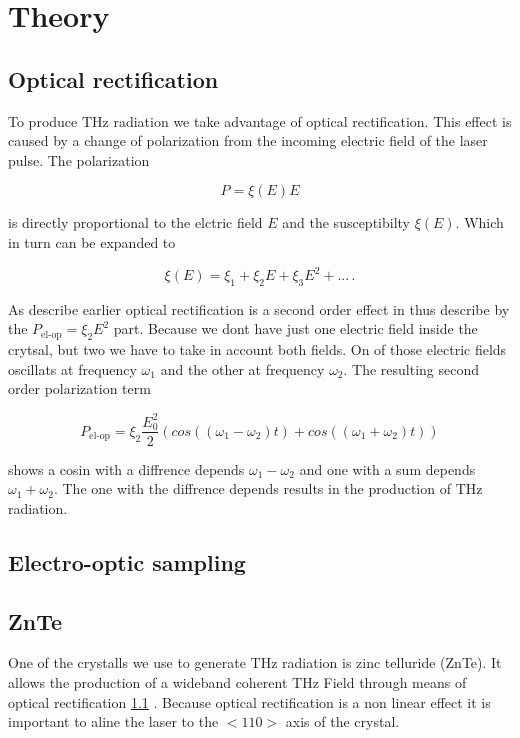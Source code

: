 \chapter{Theory}

\section{Optical rectification}\label{sec:optic_ref}
To produce $\si{\tera\hertz}$ radiation we take advantage of optical rectification.
This effect is caused by a change of polarization from the incoming electric field of the laser pulse.
The polarization

\begin{equation}
P = \xi(E) E
\end{equation}

is directly proportional to the elctric field $E$ and the susceptibilty $\xi(E)$.
Which in turn can be expanded to 

\begin{equation}
    \xi(E) = \xi_1 + \xi_2 E +\xi_3 E^2 + ...   \, .
\end{equation}

As describe earlier optical rectification is a second order effect in thus describe by the $P_\text{el-op} = \xi_2 E^2$ part.
Because we dont have just one electric field inside the crytsal, but two we have to take in account both fields.
On of those electric fields oscillats at frequency $\omega_1$ and the other at frequency $\omega_2$.
The resulting  second order polarization term 

\begin{equation}
    P_\text{el-op} = \xi_2 \frac{E_0^2}{2}\left(cos((\omega_1 - \omega_2)t) + cos((\omega_1 + \omega_2)t)\right)
\end{equation}

shows a cosin with a diffrence depends $\omega_1-\omega_2$ and one with a sum depends $\omega_1+\omega_2$.
The one with the diffrence depends results in the production of $\si{\tera\hertz}$ radiation.

\section{Electro-optic sampling}\label{sec:eos}


\section{ZnTe}
One of the crystalls we use to generate $\si{\tera\hertz}$ radiation is zinc telluride (ZnTe). 
It allows the production of a wideband coherent $\si{\tera\hertz}$ Field through means of optical rectification \ref{sec:optic_ref} \cite{ZnTe_Nahata_Weling_1996}.
Because optical rectification is a non linear effect it is important to aline the laser to the $<110>$ axis of the crystal.


